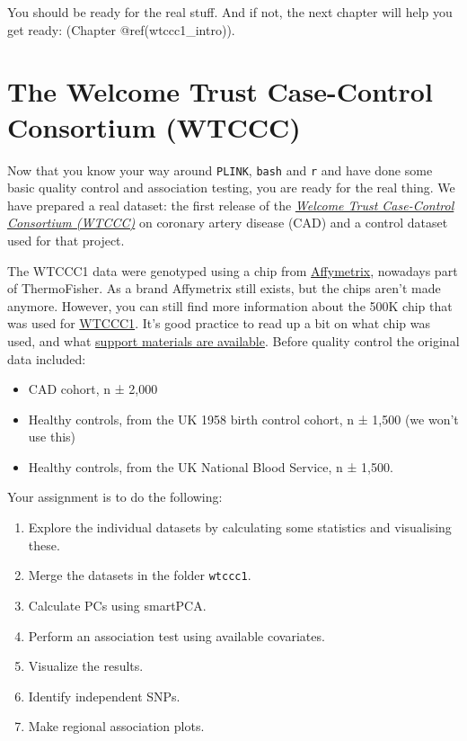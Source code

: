 \documentclass[
]{book}
\providecommand{\tightlist}{%
  \setlength{\itemsep}{0pt}\setlength{\parskip}{0pt}}
\begin{document}
You should be ready for the real stuff. And if not, the next chapter will help you get ready: (Chapter @ref(wtccc1\_intro)).

\hypertarget{the-welcome-trust-case-control-consortium-wtccc}{%
\chapter{The Welcome Trust Case-Control Consortium (WTCCC)}\label{the-welcome-trust-case-control-consortium-wtccc}}

Now that you know your way around \texttt{PLINK}, \texttt{bash} and \texttt{r} and have done some basic quality control and association testing, you are ready for the real thing. We have prepared a real dataset: the first release of the \href{https://www.wtccc.org.uk/ccc1/overview.html}{\emph{Welcome Trust Case-Control Consortium (WTCCC)}} on coronary artery disease (CAD) and a control dataset used for that project.

The WTCCC1 data were genotyped using a chip from \href{https://www.thermofisher.com/us/en/home/life-science/microarray-analysis/affymetrix.html?category=34000\&categoryIdClicked=34000\&rootCategoryId=34000\&navMode=34000\&aId=productsNav}{Affymetrix}, nowadays part of ThermoFisher. As a brand Affymetrix still exists, but the chips aren't made anymore. However, you can still find more information about the 500K chip that was used for \href{http://www.affymetrix.com/support/technical/datasheets/500k_datasheet.pdf}{WTCCC1}. It's good practice to read up a bit on what chip was used, and what \href{http://www.affymetrix.com/support/technical/byproduct.affx?product=500k}{support materials are available}. Before quality control the original data included:

\begin{itemize}
\tightlist
\item
  CAD cohort, n ± 2,000
\item
  Healthy controls, from the UK 1958 birth control cohort, n ± 1,500 (we won't use this)
\item
  Healthy controls, from the UK National Blood Service, n ± 1,500.
\end{itemize}

Your assignment is to do the following:

\begin{enumerate}
\def\labelenumi{\arabic{enumi})}
\tightlist
\item
  Explore the individual datasets by calculating some statistics and visualising these.
\item
  Merge the datasets in the folder \texttt{wtccc1}.
\item
  Calculate PCs using smartPCA.
\item
  Perform an association test using available covariates.
\item
  Visualize the results.
\item
  Identify independent SNPs.
\item
  Make regional association plots.
\end{enumerate}
\end{document}
